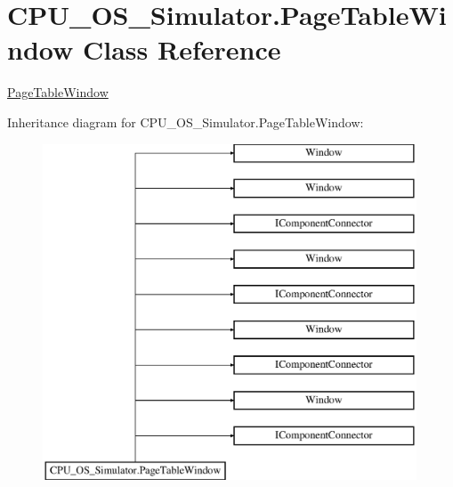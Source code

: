\hypertarget{class_c_p_u___o_s___simulator_1_1_page_table_window}{}\section{C\+P\+U\+\_\+\+O\+S\+\_\+\+Simulator.\+Page\+Table\+Window Class Reference}
\label{class_c_p_u___o_s___simulator_1_1_page_table_window}


\hyperlink{class_c_p_u___o_s___simulator_1_1_page_table_window}{Page\+Table\+Window}  


Inheritance diagram for C\+P\+U\+\_\+\+O\+S\+\_\+\+Simulator.\+Page\+Table\+Window\+:\begin{figure}[H]
\begin{center}
\leavevmode
\includegraphics[height=10.000000cm]{class_c_p_u___o_s___simulator_1_1_page_table_window}
\end{center}
\end{figure}
